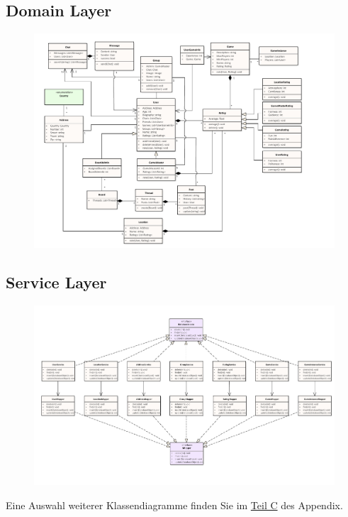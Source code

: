\subsection*{Domain Layer}
\begin{figure}[h!]
	\centering
	\includegraphics[width = 0.8\linewidth]{docs/5_Klassendiagramme/Marius/DomainLayer.pdf}
	\label{fig:ClassDia_Domain_Layer}
\end{figure}

\vfill

\subsection*{Service Layer}
\begin{figure}[h!]
	\centering
	\includegraphics[width=0.8\linewidth]{docs/5_Klassendiagramme/Marius/ServiceLayer.pdf}
	\label{fig:ClassDia_Service_Layer}
\end{figure}

\vfill

Eine Auswahl weiterer Klassendiagramme finden Sie im \hyperref[app:C_Klassendiagramme]{Teil C} des Appendix.